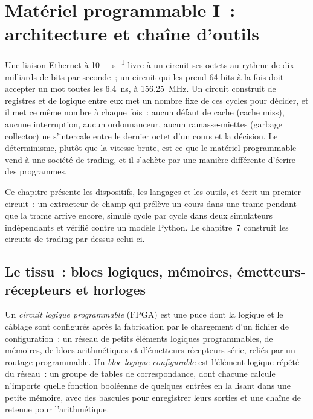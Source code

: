\chapter{Matériel programmable I~: architecture et chaîne d'outils}\label{ch:nw:programmable-hardware-i-architecture-and-toolchain}

Une liaison Ethernet à \qty{10}{\giga\bit\per\second} livre à un circuit ses octets au rythme de dix milliards de bits par seconde~; un circuit qui les prend
64 bits à la fois doit accepter un mot toutes les \qty{6.4}{\nano\second}, à 156.25~MHz. Un circuit construit de registres et de logique entre eux
met un nombre fixe de ces cycles pour décider, et il met ce même nombre à chaque fois~: aucun défaut de cache (cache miss), aucune interruption, aucun ordonnanceur, aucun
ramasse-miettes (garbage collector) ne s'intercale entre le dernier octet d'un cours et la décision. Le déterminisme, plutôt que la vitesse brute, est ce que le matériel programmable
vend à une société de trading, et il s'achète par une manière différente d'écrire des programmes.

Ce chapitre présente les dispositifs, les langages et les outils, et écrit un premier circuit~: un extracteur de champ qui prélève un cours
dans une trame pendant que la trame arrive encore, simulé cycle par cycle dans deux simulateurs indépendants et vérifié contre un
modèle Python. Le chapitre~7 construit les circuits de trading par-dessus celui-ci.

\section{Le tissu~: blocs logiques, mémoires, émetteurs-récepteurs et horloges}

\begin{definition}\label{def:nw:programmable-hardware-i-architecture-and-toolchain:clb}
Un \emph{circuit logique programmable} (FPGA) est une puce dont la logique et le câblage sont configurés
après la fabrication par le chargement d'un fichier de configuration~: un réseau de petits éléments logiques programmables, de mémoires, de blocs arithmétiques et
d'émetteurs-récepteurs série, reliés par un routage programmable. Un \emph{bloc logique configurable} est l'élément logique répété du réseau~:
un groupe de tables de correspondance, dont chacune calcule n'importe quelle fonction booléenne de quelques entrées en la lisant
dans une petite mémoire, avec des bascules pour enregistrer leurs sorties et une chaîne de retenue pour l'arithmétique.
\end{definition}

